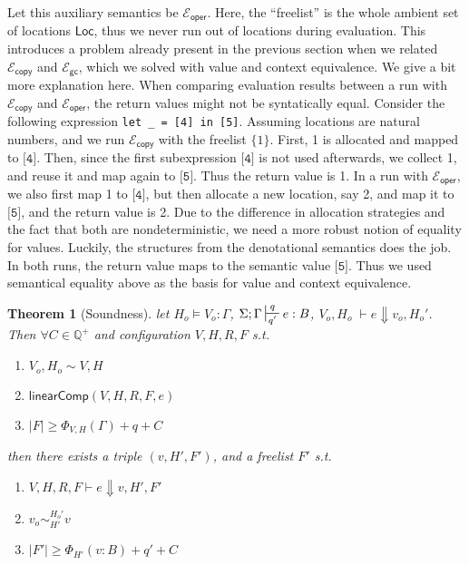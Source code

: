 \documentclass{easychair}
\newtheorem{theorem}{Theorem}
\newcommand{\ms}[1]{\ensuremath{\mathsf{#1}}}
\newcommand{\wfc}[5]{\mathsf{linearComp}(#1,#2,#3,#4,#5)}
\newcommand{\veq}[4]{#3 \sim^{#1}_{#2} #4}
\newcommand{\gcSem}{\ensuremath{\mathcal{E}_{\ms{gc}}}}
\newcommand{\copySem}{\ensuremath{\mathcal{E}_{\ms{copy}}}}
\theoremstyle{definition}
\begin{document}
Let this auxiliary semantics be $\mathcal{E}_{\ms{oper}}$. Here, the ``freelist'' is the whole ambient set of locations $\ms{Loc}$, 
thus we never run out of locations during evaluation. This introduces a problem 
already present in the previous section when we related \copySem{} and \gcSem{}, 
which we solved with value and context equivalence. We give a bit more explanation here.
When comparing evaluation results between a run with \copySem{} and $\mathcal{E}_{\ms{oper}}$, the return values 
might not be syntatically equal. Consider the following expression
\texttt{let \_ = [4] in [5]}.
%
Assuming locations are natural numbers, and we run \copySem{} with the freelist $\{1\}$. 
First, 1 is allocated and mapped to $\texttt{[4]}$. 
Then, since the first subexpression $\texttt{[4]}$ is not used afterwards, we collect 1, and reuse it
and map again to $\texttt{[5]}$. Thus the return value is 1.  In a run with $\mathcal{E}_{\ms{oper}}$, 
we also first map 1 to $\texttt{[4]}$, but then 
allocate a new location, say 2, and map it to $\texttt{[5]}$, and the return value is 2. Due to the 
difference in allocation strategies and the fact that both are nondeterministic, we need a more 
robust notion of equality for values. Luckily, the structures from the denotational semantics 
does the job. In both runs, the return value maps to the semantic value $\texttt{[5]}$.
Thus we used semantical equality above as the basis for value and context equivalence. 

\begin{theorem}[Soundness]
\label{b} let $H_o \vDash V_o : \Gamma$, $\Sigma; \Gamma \sststile{q'}{q} e : B$,
$V_o,H_o \; \vdash e \Downarrow v_o, H_o'$.
Then $\forall C \in \mathbb{Q}^{+}$ and configuration $V,H,R,F$ s.t.
\begin{enumerate} 
\item $V_o,H_o \sim V,H$
\item $\wfc{V}{H}{R}{F}{e}$
\item $|F| \ge \Phi_{V,H}(\Gamma) + q + C$ 
\end{enumerate}
then there exists a triple $(v,H',F')$, and a freelist $F'$ s.t.
\begin{enumerate}
  \item $V,H,R,F \vdash e \Downarrow v, H', F'$
	\item $\veq{H_o'}{H'}{v_o}{v}$
  \item $|F'| \ge \Phi_{H'}(v:B) + q' + C$
\end{enumerate}
\end{theorem}
\end{document}
